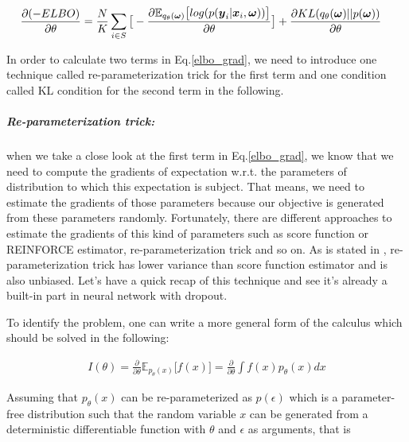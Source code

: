 \begin{equation}
\begin{aligned} \label{elbo_grad}
\frac{\partial (-ELBO)}{\partial \theta} &=\frac{N}{K}\sum_{i \in S}\big[-\frac{\partial \mathbb E_{q_{\theta}(\boldsymbol \omega)} \big[log(p(\boldsymbol y_{i}| \boldsymbol x_{i}, \boldsymbol \omega))\big]}{\partial \theta}\big] + \frac{\partial KL(q_{\theta}(\boldsymbol \omega)||p(\boldsymbol \omega))}{\partial \theta}
\end{aligned}
\end{equation}

In order to calculate two terms in Eq.\ref{elbo_grad}, we need to introduce one technique called re-parameterization trick\cite{kingma2013auto} for the first term and one condition called KL condition\cite{gal2016uncertainty} for the second term in the following.

\subparagraph{Re-parameterization trick:} when we take a close look at the first term in Eq.\ref{elbo_grad}, we know that we need to compute the gradients of expectation w.r.t. the parameters of distribution to which this expectation is subject. That means, we need to estimate the gradients of those parameters because our objective is generated from these parameters randomly. Fortunately, there are different approaches to estimate the gradients of this kind of parameters such as score function or REINFORCE estimator\cite{williams1992simple}, re-parameterization trick \cite{kingma2013auto} and so on. As is stated in \cite{kingma2013auto}, re-parameterization trick has lower variance than score function estimator and is also unbiased. Let's have a quick recap of this technique and see it's already a built-in part in neural network with dropout.

To identify the problem, one can write a more general form of the calculus which should be solved in the following:

\begin{equation}
\begin{aligned} \label{repa}
I(\theta) = \frac{\partial}{\partial \theta} \mathbb E_{p_{\theta}(x)} \big[ f(x)\big]= \frac{\partial}{\partial \theta} \int f(x) p_{\theta}(x) dx
\end{aligned}
\end{equation} 

Assuming that $p_{\theta}(x)$ can be re-parameterized as $p(\epsilon)$ which is a parameter-free distribution such that the random variable $x$ can be generated from a deterministic differentiable function with $\theta$ and $\epsilon$ as arguments, that is

